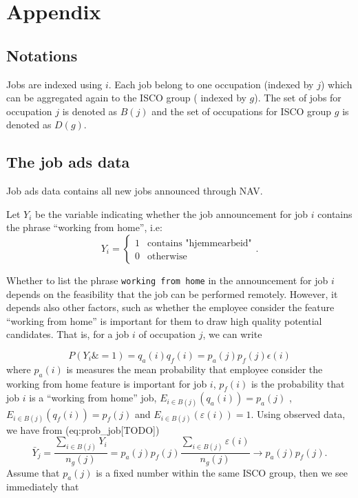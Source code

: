 \documentclass[11pt,]{article}
\begin{document}
\hypertarget{appendix}{%
\section{Appendix}\label{appendix}}

\hypertarget{notations}{%
\subsection{Notations}\label{notations}}

Jobs are indexed using \(i\). Each job belong to one occupation (indexed
by \(j\)) which can be aggregated again to the ISCO group ( indexed by
\(g\)). The set of jobs for occupation \(j\) is denoted as \(B(j)\) and
the set of occupations for ISCO group \(g\) is denoted as \(D(g)\).

\hypertarget{the-job-ads-data}{%
\subsection{The job ads data}\label{the-job-ads-data}}

Job ads data contains all new jobs announced through NAV.

Let \(Y_{i}\) be the variable indicating whether the job announcement
for job \(i\) contains the phrase ``working from home'', i.e: \[
Y_{i}=\begin{cases}
1 & \text{contains "hjemmearbeid"}\\
0 & \text{otherwise}
\end{cases}.
\]

Whether to list the phrase \texttt{working\ from\ home} in the
announcement for job \(i\) depends on the feasibility that the job can
be performed remotely. However, it depends also other factors, such as
whether the employee consider the feature ``working from home'' is
important for them to draw high quality potential candidates. That is,
for a job \(i\) of occupation \(j\), we can write

\[P(Y_{i} \& =1)=q_{a}(i)q_{f}(i)=p_{a}(j)p_{f}(j)\epsilon(i)\] where
\(p_{a}(i)\) is measures the mean probability that employee consider the
working from home feature is important for job \(i\), \(p_{f}(i)\) is
the probability that job \(i\) is a ``working from home'' job,
\(E_{i\in B(j)}(q_{a}(i))=p_{a}(j)\) ,
\(E_{i\in B(j)}(q_{f}(i))=p_{f}(j)\) and
\(E_{i\in B(j)}(\varepsilon(i))=1\). Using observed data, we have from
(eq:prob\_job{[}TODO{]}) \[
\bar{Y}_{j}=\frac{\sum_{i\in B(j)}Y_{i}}{n_{g}(j)}=p_{a}(j)p_{f}(j)\frac{\sum_{i\in B(j)}\varepsilon(i)}{n_{g}(j)}\longrightarrow p_{a}(j)p_{f}(j).
\] Assume that \(p_{a}(j)\) is a fixed number within the same ISCO
group, then we see immediately that
\end{document}
